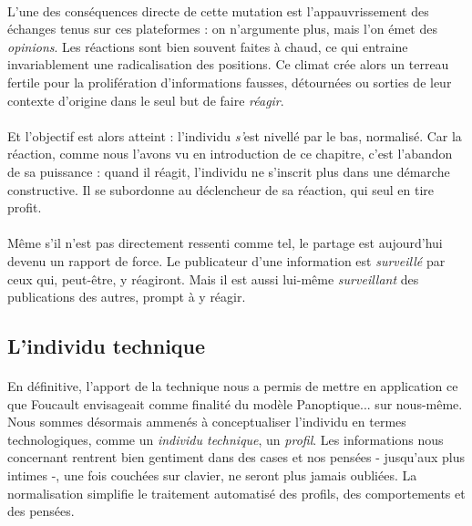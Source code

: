 \paragraph{} L'une des conséquences directe de cette mutation est l'appauvrissement des échanges tenus sur ces plateformes :
on n'argumente plus, mais l'on émet des \emph{opinions}. Les réactions sont bien souvent faites à chaud, ce qui entraine
invariablement une radicalisation des positions. Ce climat crée alors un terreau fertile pour la prolifération d'informations
fausses, détournées ou sorties de leur contexte d'origine dans le seul but de faire \emph{réagir}.

\paragraph{} Et l'objectif est alors atteint : l'individu \emph{s'}est nivellé par le bas, normalisé. Car la réaction,
comme nous l'avons vu en introduction de ce chapitre, c'est l'abandon de sa puissance : quand il réagit, l'individu
ne s'inscrit plus dans une démarche constructive. Il se subordonne au déclencheur de sa réaction, qui seul en tire profit.

\paragraph{} Même s'il n'est pas directement ressenti comme tel, le partage est aujourd'hui devenu un rapport de force. 
Le publicateur d'une information est \emph{surveillé} par ceux qui, peut-être, y réagiront. Mais il est aussi lui-même
\emph{surveillant} des publications des autres, prompt à y réagir. 


\subsection*{L'individu technique}

\paragraph{} En définitive, l'apport de la technique nous a permis de mettre en application ce que Foucault envisageait
comme finalité du modèle Panoptique... sur nous-même. Nous sommes désormais ammenés à conceptualiser l'individu en termes
technologiques, comme un \emph{individu technique}, un \emph{profil}. Les informations nous concernant rentrent bien
gentiment dans des cases et nos pensées - jusqu'aux plus intimes -, une fois couchées sur clavier, ne seront plus jamais oubliées.
La normalisation simplifie le traitement automatisé des profils, des comportements et des pensées.

